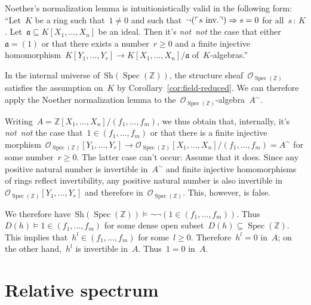 \documentclass[10pt,reqno,a4paper]{amsbook}
\makeatletter
\theoremstyle{definition}
\theoremstyle{plain}
\theoremstyle{remark}
\newcommand{\ZZ}{\mathbb{Z}}
\renewcommand{\O}{\mathcal{O}}
\newcommand{\aaa}{\mathfrak{a}}
\newcommand{\Sh}{\mathrm{Sh}}
\DeclareMathOperator{\Spec}{Spec}
\newcommand{\?}{\,{:}\,}
\renewcommand{\_}{\mathpunct{.}\,}
\newcommand{\speak}[1]{\ulcorner\text{\textnormal{#1}}\urcorner}
\newcommand{\inv}{inv.\@}
\newcommand{\notnot}{\emph{not~not}\xspace}
\renewenvironment{proof}[1][\proofname]{\par
  \pushQED{\qed}%
  \normalfont \topsep6\p@\@plus6\p@\relax
  \trivlist
  \item[\hskip\labelsep
        \itshape
    #1\@addpunct{.}]\ignorespaces
}{%
  \popQED\endtrivlist\@endpefalse
}
\makeatother
\begin{document}
\begin{proof}[Proof of Proposition~\ref{prop:fingen-algebra-q}]
Noether's normalization lemma is intuitionistically valid in the following
form: ``Let~$K$ be a ring such that~$1 \neq 0$ and such that~$\neg(\speak{$s$
\inv}) \Rightarrow s = 0$ for all~$s \? K$. Let~$\aaa \subseteq
K[X_1,\ldots,X_n]$ be an ideal. Then it's \notnot the case that either~$\aaa =
(1)$ or that there exists a number~$r \geq 0$ and a finite injective
homomorphism~$K[Y_1,\ldots,Y_r] \to K[X_1,\ldots,X_n]/\aaa$ of~$K$-algebras.''

In the internal universe of~$\Sh(\Spec(\ZZ))$, the structure
sheaf~$\O_{\Spec(\ZZ)}$ satisfies the assumption on~$K$ by
Corollary~\ref{cor:field-reduced}. We can therefore apply the Noether
normalization lemma to the~$\O_{\Spec(\ZZ)}$-algebra~$A^\sim$.

Writing~$A =
\ZZ[X_1,\ldots,X_n]/(f_1,\ldots,f_m)$, we thus obtain that, internally,
it's \notnot the case that~$1 \in (f_1,\ldots,f_m)$ or that there
is a finite injective
morphism~$\O_{\Spec(\ZZ)}[Y_1,\ldots,Y_r] \to
\O_{\Spec(\ZZ)}[X_1,\ldots,X_n]/(f_1,\ldots,f_m) = A^\sim$ for some number~$r
\geq 0$. The latter case can't occur: Assume that it does. Since any positive natural number is invertible in~$A^\sim$ and finite
injective homomorphisms of rings reflect invertibility, any positive natural
number is also invertible in~$\O_{\Spec(\ZZ)}[Y_1,\ldots,Y_r]$ and therefore
in~$\O_{\Spec(\ZZ)}$. This, however, is false.

We therefore have~$\Sh(\Spec(\ZZ)) \models \neg\neg(1 \in (f_1,\ldots,f_m))$.
Thus~$D(h) \models 1 \in (f_1,\ldots,f_m)$ for some dense open subset~$D(h)
\subseteq \Spec(\ZZ)$. This implies that~$h^l \in (f_1,\ldots,f_m)$ for some~$l
\geq 0$. Therefore~$h^l = 0$ in~$A$; on the other hand,~$h^l$ is invertible
in~$A$. Thus~$1 = 0$ in~$A$.
\end{proof}




\section{Relative spectrum}
\label{sect:relative-spectrum}
\end{document}

